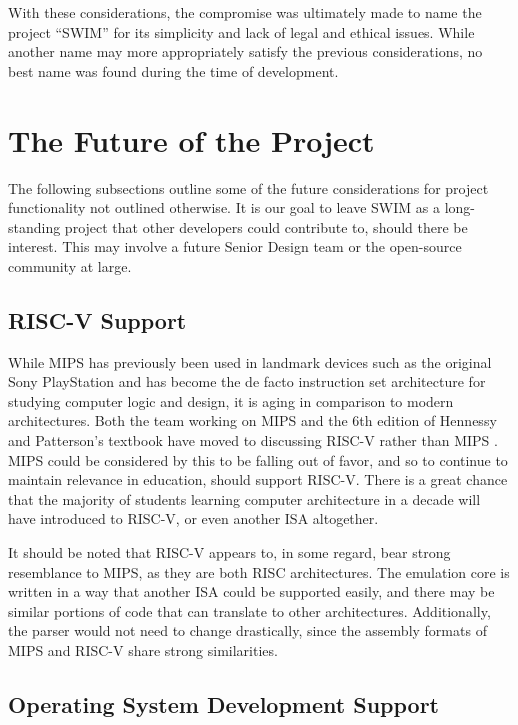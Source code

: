 \documentclass[
    paper=letter,
    parskip=half,
    fontsize=12pt,
    titlepage=firstiscover,
    toc=bibliography,
    numbers=endperiod
]{scrartcl}
\let\oldsection\section
\renewcommand{\section}{\newpage\oldsection}
\begin{document}
With these considerations, the compromise was ultimately made to name
the project ``SWIM'' for its simplicity and lack of legal and ethical
issues. While another name may more appropriately satisfy the previous
considerations, no best name was found during the time of development.

\section{The Future of the Project}

The following subsections outline some of the future considerations for
project functionality not outlined otherwise. It is our goal to leave
SWIM as a long-standing project that other developers could contribute
to, should there be interest. This may involve a future Senior Design
team or the open-source community at large.

\subsection{RISC-V Support}

While MIPS has previously been used in landmark devices such as the
original Sony PlayStation and has become the de facto instruction set
architecture for studying computer logic and design, it is aging in
comparison to modern architectures. Both the team working on MIPS and
the 6th edition of Hennessy and Patterson's textbook have moved to
discussing RISC-V rather than MIPS \cites[p.~xviii]
{hennessy-patterson-6}{mips-to-risc-v}. MIPS could be considered by this
to be falling out of favor, and so to continue to maintain relevance in
education, should support RISC-V. There is a great chance that the
majority of students learning computer architecture in a decade will
have introduced to RISC-V, or even another ISA altogether.

It should be noted that RISC-V appears to, in some regard, bear strong
resemblance to MIPS, as they are both RISC architectures. The emulation
core is written in a way that another ISA could be supported easily, and
there may be similar portions of code that can translate to other
architectures. Additionally, the parser would not need to change
drastically, since the assembly formats of MIPS and RISC-V share strong
similarities.

\subsection{Operating System Development Support}
\end{document}
